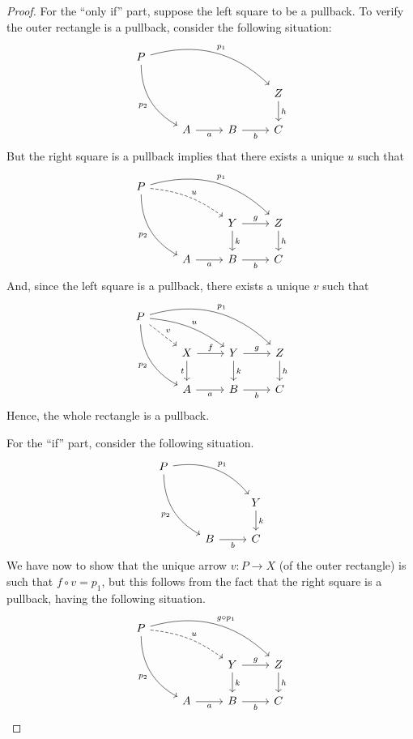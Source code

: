 \begin{proof}
    For the ``only if'' part, suppose the left square to be a pullback. To verify the outer rectangle is a pullback, consider the following situation:
    \[
        \begin{tikzcd}
            P \arrow[bend left=30]{rrrd}{p_1} \arrow[bend right=30, swap]{ddr}{p_2} & & \\
            & & & Z \arrow[d, "h"] \\
            & A \arrow[r, "a"swap] & B \arrow[r, "b"swap] & C
        \end{tikzcd}
    \]
    But the right square is a pullback implies that there exists a unique $u$ such that
    \[
        \begin{tikzcd}
            P \arrow[bend left=30]{rrrd}{p_1} \arrow[bend right=30, swap]{ddr}{p_2} \arrow[bend left=15, dashed]{drr}{u}& & \\
            & &  Y \arrow[r, "g"] \arrow[d, "k"]& Z \arrow[d, "h"] \\
            & A \arrow[r, "a"swap] & B \arrow[r, "b"swap] & C
        \end{tikzcd}
    \]
    And, since the left square is a pullback, there exists a unique $v$ such that
    \[
        \begin{tikzcd}
            P \arrow[bend left=30]{rrrd}{p_1} \arrow[bend right=30, swap]{ddr}{p_2} \arrow[bend left=15]{drr}{u} \arrow[dr, "v", dashed]& & \\
            & X \arrow[r, "f"] \arrow[d, "t"swap] &  Y \arrow[r, "g"] \arrow[d, "k"]& Z \arrow[d, "h"] \\
            & A \arrow[r, "a"swap] & B \arrow[r, "b"swap] & C
        \end{tikzcd}
    \]
    Hence, the whole rectangle is a pullback.

    For the ``if'' part, consider the following situation.
    \[
        \begin{tikzcd}
            P \arrow[bend left=30]{rrd}{p_1} \arrow[bend right=30, swap]{ddr}{p_2} & \\
            & & Y \arrow[d, "k"] \\
            & B \arrow[r, "b"swap] & C
        \end{tikzcd}
    \]
    We have now to show that the unique arrow $v: P \to X$ (of the outer rectangle) is such that $f \circ v = p_1$, but this follows from the fact that the right square is a pullback, having the following situation.
    \[
        \begin{tikzcd}
            P \arrow[bend left=30]{rrrd}{g \circ p_1} \arrow[bend right=30, swap]{ddr}{p_2} \arrow[bend left=15, dashed]{drr}{u}& & \\
            & &  Y \arrow[r, "g"] \arrow[d, "k"]& Z \arrow[d, "h"] \\
            & A \arrow[r, "a"swap] & B \arrow[r, "b"swap] & C
        \end{tikzcd}
    \]
\end{proof}    

